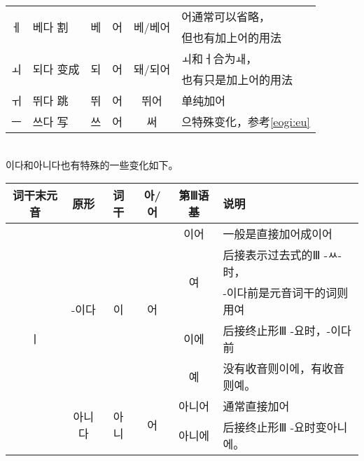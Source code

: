 \begin{tabular}{|c|l|l|c|c|l|}
	\multirow{2}{*}{ㅔ} & \multirow{2}{*}{베다 割}  & \multirow{2}{*}{베}  & \multirow{2}{*}{어} & \multirow{2}{*}{베/베어}   & 어通常可以省略，              \\
	                   &                        &                     &                    &                         & 但也有加上어的用法             \\\hline
	\multirow{2}{*}{ㅚ} & \multirow{2}{*}{되다 变成} & \multirow{2}{*}{되}  & \multirow{2}{*}{어} & \multirow{2}{*}{돼/되어}   & ㅚ和ㅓ合为ㅙ，               \\
	                   &                        &                     &                    &                         & 也有只是加上어的用法            \\\hline
	ㅟ                  & 뛰다 跳                   & 뛰                   & 어                  & 뛰어                      & 单纯加어                  \\\hline
	ㅡ                  & 쓰다 写                   & 쓰                   & 어                  & 써                       & 으特殊变化，参考\ref{eogi:eu} \\\hline
\end{tabular}\\
이다和아니다也有特殊的一些变化如下。\\
\begin{tabular}{|c|c|c|c|c|l|}
	\hline
	词干末元音              & 原形                   & 词干                  & 아/어                & 第Ⅲ语基               & 说明              \\\hline
	\multirow{7}{*}{ㅣ} & \multirow{5}{*}{-이다} & \multirow{5}{*}{이}  & \multirow{5}{*}{어} & 이어                 & 一般是直接加어成이어      \\\cline{5-6}
	                   &                      &                     &                    & \multirow{2}{*}{여} & 后接表示过去式的Ⅲ -ㅆ-时， \\
	                   &                      &                     &                    &                    & -이다前是元音词干的词则用여  \\\cline{5-6}
	                   &                      &                     &                    & 이에                 & 后接终止形Ⅲ -요时，-이다前 \\\cline{5-5}
	                   &                      &                     &                    & 예                  & 没有收音则이에，有收音则예。  \\\cline{2-6}
	                   & \multirow{2}{*}{아니다} & \multirow{2}{*}{아니} & \multirow{2}{*}{어} & 아니어                & 通常直接加어          \\\cline{5-6}
	                   &                      &                     &                    & 아니에                & 后接终止形Ⅲ -요时变아니에。 \\\hline
\end{tabular}\\
